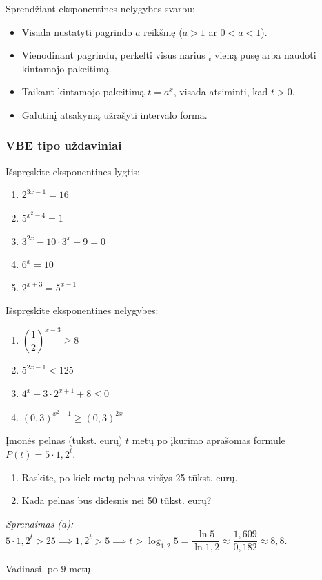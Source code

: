 \begin{remark}
Sprendžiant eksponentines nelygybes svarbu:
\begin{itemize}
    \item Visada nustatyti pagrindo $a$ reikšmę ($a > 1$ ar $0 < a < 1$).
    \item Vienodinant pagrindu, perkelti visus narius į vieną pusę arba naudoti kintamojo 
    pakeitimą.
    \item Taikant kintamojo pakeitimą $t = a^x$, visada atsiminti, kad $t > 0$.
    \item Galutinį atsakymą užrašyti intervalo forma.
\end{itemize}
\end{remark}

\subsubsection*{VBE tipo uždaviniai}

\begin{exercise}
Išspręskite eksponentines lygtis:
\begin{enumerate}[label=\alph*)]
    \item $2^{3x-1} = 16$
    \item $5^{x^2 - 4} = 1$
    \item $3^{2x} - 10 \cdot 3^x + 9 = 0$
    \item $6^x = 10$
    \item $2^{x+3} = 5^{x-1}$
\end{enumerate}
\end{exercise}

\begin{exercise}
Išspręskite eksponentines nelygybes:
\begin{enumerate}[label=\alph*)]
    \item $\left(\dfrac{1}{2}\right)^{x-3} \geq 8$
    \item $5^{2x-1} < 125$
    \item $4^x - 3 \cdot 2^{x+1} + 8 \leq 0$
    \item $\left(0{,}3\right)^{x^2-1} \geq \left(0{,}3\right)^{2x}$
\end{enumerate}
\end{exercise}

\begin{exercise}
Įmonės pelnas (tūkst. eurų) $t$ metų po įkūrimo aprašomas formule 
$P(t) = 5 \cdot 1{,}2^t$.
\begin{enumerate}[label=\alph*)]
    \item Raskite, po kiek metų pelnas viršys 25 tūkst. eurų.
    \item Kada pelnas bus didesnis nei 50 tūkst. eurų?
\end{enumerate}
\textit{Sprendimas (a):} $5 \cdot 1{,}2^t > 25 \implies 1{,}2^t > 5 \implies 
t > \log_{1{,}2} 5 = \dfrac{\ln 5}{\ln 1{,}2} \approx \dfrac{1{,}609}{0{,}182} \approx 8{,}8.$

Vadinasi, po $9$ metų.
\end{exercise}

